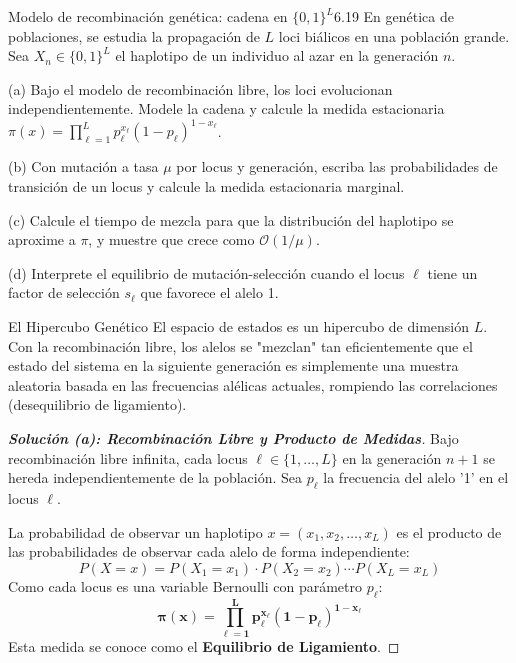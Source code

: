 \documentclass[10pt,a4paper]{article}
\begin{document}
\begin{ejercicio}{Modelo de recombinación genética: cadena en $\{0,1\}^L$}{6.19}
    En genética de poblaciones, se estudia la propagación de $L$ loci biálicos en una población grande. Sea $X_n \in \{0, 1\}^L$ el haplotipo de un individuo al azar en la generación $n$.
    
    (a) Bajo el modelo de recombinación libre, los loci evolucionan independientemente. Modele la cadena y calcule la medida estacionaria $\pi(x) = \prod_{\ell=1}^L p_\ell^{x_\ell} (1 - p_\ell)^{1-x_\ell}$.
    
    (b) Con mutación a tasa $\mu$ por locus y generación, escriba las probabilidades de transición de un locus y calcule la medida estacionaria marginal.
    
    (c) Calcule el tiempo de mezcla para que la distribución del haplotipo se aproxime a $\pi$, y muestre que crece como $\mathcal{O}(1/\mu)$.
    
    (d) Interprete el equilibrio de mutación-selección cuando el locus $\ell$ tiene un factor de selección $s_\ell$ que favorece el alelo 1.
\end{ejercicio}

\vspace{2mm}

\begin{nota}{El Hipercubo Genético}
    El espacio de estados es un hipercubo de dimensión $L$. Con la recombinación libre, los alelos se "mezclan" tan eficientemente que el estado del sistema en la siguiente generación es simplemente una muestra aleatoria basada en las frecuencias alélicas actuales, rompiendo las correlaciones (desequilibrio de ligamiento).
\end{nota}

\begin{proof}[\textbf{Solución (a): Recombinación Libre y Producto de Medidas}]
    Bajo recombinación libre infinita, cada locus $\ell \in \{1, \dots, L\}$ en la generación $n+1$ se hereda independientemente de la población. Sea $p_\ell$ la frecuencia del alelo '1' en el locus $\ell$.
    
    La probabilidad de observar un haplotipo $x = (x_1, x_2, \dots, x_L)$ es el producto de las probabilidades de observar cada alelo de forma independiente:
    \[ P(X = x) = P(X_1 = x_1) \cdot P(X_2 = x_2) \cdots P(X_L = x_L) \]
    Como cada locus es una variable Bernoulli con parámetro $p_\ell$:
    \[ \mathbf{\pi(x) = \prod_{\ell=1}^L p_\ell^{x_\ell} (1 - p_\ell)^{1-x_\ell}} \]
    Esta medida se conoce como el \textbf{Equilibrio de Ligamiento}.
\end{proof}
\end{document}
